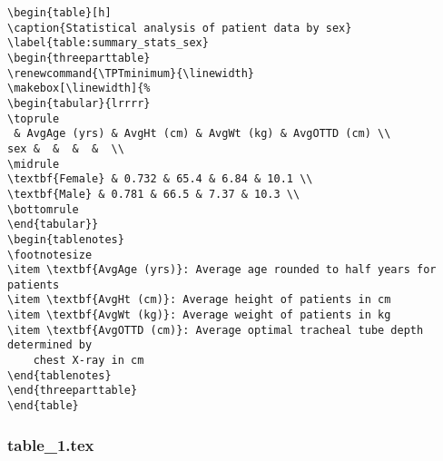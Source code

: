 \documentclass[11pt]{article}
\begin{document}
\begin{Verbatim}[tabsize=4]
\begin{table}[h]
\caption{Statistical analysis of patient data by sex}
\label{table:summary_stats_sex}
\begin{threeparttable}
\renewcommand{\TPTminimum}{\linewidth}
\makebox[\linewidth]{%
\begin{tabular}{lrrrr}
\toprule
 & AvgAge (yrs) & AvgHt (cm) & AvgWt (kg) & AvgOTTD (cm) \\
sex &  &  &  &  \\
\midrule
\textbf{Female} & 0.732 & 65.4 & 6.84 & 10.1 \\
\textbf{Male} & 0.781 & 66.5 & 7.37 & 10.3 \\
\bottomrule
\end{tabular}}
\begin{tablenotes}
\footnotesize
\item \textbf{AvgAge (yrs)}: Average age rounded to half years for patients
\item \textbf{AvgHt (cm)}: Average height of patients in cm
\item \textbf{AvgWt (kg)}: Average weight of patients in kg
\item \textbf{AvgOTTD (cm)}: Average optimal tracheal tube depth determined by
	chest X-ray in cm
\end{tablenotes}
\end{threeparttable}
\end{table}

\end{Verbatim}

\subsubsection*{table\_1.tex}
\end{document}
